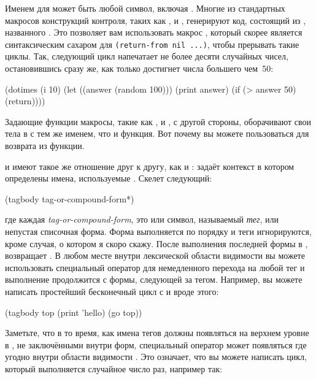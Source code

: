 Именем для  может быть любой символ, включая . Многие из стандартных
макросов конструкций контроля, таких как ,  и ,
генерируют код, состоящий из , названного . Это позволяет вам
использовать макрос , который скорее является синтаксическим сахаром для
\lstinline!(return-from nil ...)!, чтобы прерывать такие циклы. Так, следующий цикл
напечатает не более десяти случайных чисел, остановившись сразу же, как только достигнет
числа большего чем~50:

\begin{myverb}
(dotimes (i 10)
  (let ((answer (random 100)))
    (print answer)
    (if (> answer 50) (return))))
\end{myverb}

Задающие функции макросы, такие как ,  и , с другой
стороны, оборачивают свои тела в  с тем же именем, что и функция. Вот почему
вы можете пользоваться  для возврата из функции.

 и  имеют такое же отношение друг к другу, как  и
:  задаёт контекст в котором определены имена,
используемые . Скелет  следующий:

\begin{myverb}
(tagbody
  tag-or-compound-form*)
\end{myverb}

\noindent{}где каждая \textit{tag-or-compound-form}, это или символ, называемый \textit{тег}, или
непустая списочная форма. Форма выполняется по порядку и теги игнорируются, кроме случая,
о котором я скоро скажу. После выполнения последней формы в , 
возвращает . В любом месте внутри лексической области видимости 
вы можете использовать специальный оператор  для немедленного перехода на любой
тег и выполнение продолжится с формы, следующей за тегом. Например, вы можете написать
простейший бесконечный цикл с  и  вроде этого:

\begin{myverb}
(tagbody
 top
   (print 'hello)
   (go top))
\end{myverb}

Заметьте, что в то время, как имена тегов должны появляться на верхнем уровне в
, не заключёнными внутри форм, специальный оператор  может
появляться где угодно внутри области видимости . Это означает, что вы можете
написать цикл, который выполняется случайное число раз, например так:

